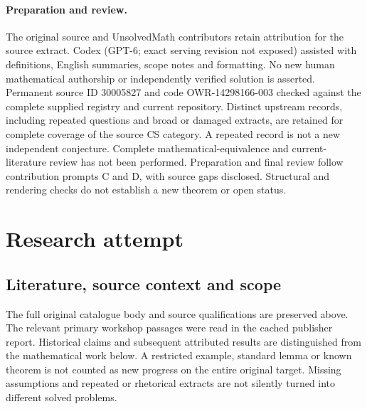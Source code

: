\documentclass[11pt]{article}
\begin{document}
\paragraph{Preparation and review.}
The original source and UnsolvedMath contributors retain attribution for the source extract. Codex (GPT-6; exact serving revision not exposed) assisted with definitions, English summaries, scope notes and formatting. No new human mathematical authorship or independently verified solution is asserted. Permanent source ID 30005827 and code OWR-14298166-003 checked against the complete supplied registry and current repository. Distinct upstream records, including repeated questions and broad or damaged extracts, are retained for complete coverage of the source CS category. A repeated record is not a new independent conjecture. Complete mathematical-equivalence and current-literature review has not been performed. Preparation and final review follow contribution prompts C and D, with source gaps disclosed. Structural and rendering checks do not establish a new theorem or open status.
\label{end:30005827}

\section{Research attempt}
\subsection{Literature, source context and scope}
The full original catalogue body and source qualifications are preserved above. The relevant primary workshop passages were read in the cached publisher report. Historical claims and subsequent attributed results are distinguished from the mathematical work below. A restricted example, standard lemma or known theorem is not counted as new progress on the entire original target. Missing assumptions and repeated or rhetorical extracts are not silently turned into different solved problems.
\end{document}
